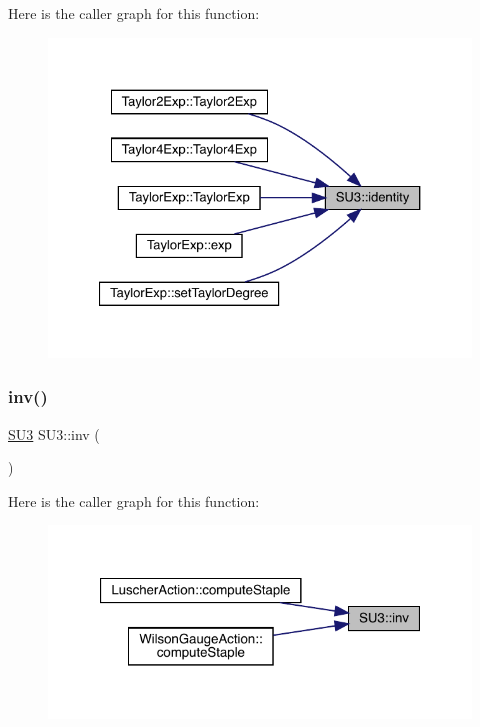 Here is the caller graph for this function\+:\nopagebreak
\begin{figure}[H]
\begin{center}
\leavevmode
\includegraphics[width=327pt]{class_s_u3_af84aef1d34a4fdcda292200804eb1221_icgraph}
\end{center}
\end{figure}
\mbox{\label{class_s_u3_ad0e19706d3c6fdb50dcf788d4b48eb4c}} 
\subsubsection{\texorpdfstring{inv()}{inv()}}
{\footnotesize\ttfamily \mbox{\hyperlink{class_s_u3}{S\+U3}} S\+U3\+::inv (\begin{DoxyParamCaption}{ }\end{DoxyParamCaption})\hspace{0.3cm}{\ttfamily [inline]}}

Here is the caller graph for this function\+:\nopagebreak
\begin{figure}[H]
\begin{center}
\leavevmode
\includegraphics[width=321pt]{class_s_u3_ad0e19706d3c6fdb50dcf788d4b48eb4c_icgraph}
\end{center}
\end{figure}
\mbox{\label{class_s_u3_a25e7cd46d60f25138585b76115e791a3}} 
